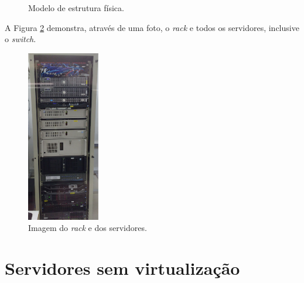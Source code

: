 \begin{figure}[h!]
 \centering
 \caption{Modelo de estrutura física.}
 \label{fig:servfisicos}
\end{figure}

A Figura \ref{fig:servrack} demonstra, através de uma foto, o \textit{rack} e todos os servidores, inclusive o \textit{switch}.

\begin{figure}[h!]
 \centering
 \includegraphics[width=120px]{img/servrack.eps}
 \caption{Imagem do \textit{rack} e dos servidores.}
 \label{fig:servrack}
\end{figure}

\section{Servidores sem virtualização}
\label{section:servsemvirt}

